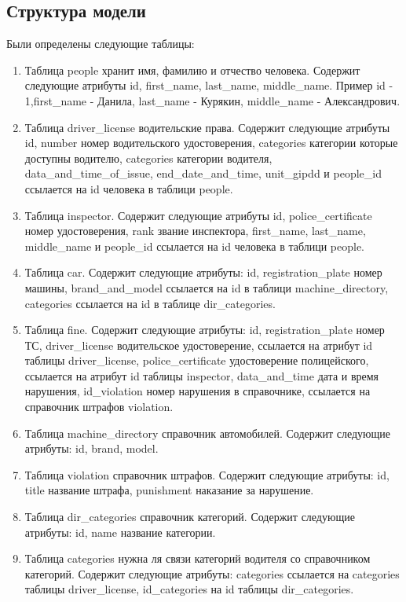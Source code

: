 \subsection{Структура модели}

Были определены следующие таблицы:
\begin{enumerate}

\item Таблица people хранит имя, фамилию и отчество человека. Содержит следующие атрибуты id, first_name, last_name, middle_name. Пример id - 1,first_name - Данила, last_name - Курякин, middle_name - Александрович. 

\item Таблица driver_license водительские права. Содержит следующие атрибуты id, number номер водительского удостоверения, categories категории которые доступны водителю, categories категории водителя, data_and_time_of_issue, end_date_and_time, unit_gipdd и people_id ссылается на id человека в таблици people. 

\item Таблица inspector. Содержит следующие атрибуты id, police_certificate номер удостоверения, rank звание инспектора, first_name, last_name, middle_name и people_id ссылается на id человека в таблици people.

\item Таблица car. Содержит следующие атрибуты: id, registration_plate номер машины, brand_and_model ссылается на id в таблици machine_directory, categories ссылается на id в таблице dir_categories.

\item Таблица fine. Содержит следующие атрибуты: id, registration_plate номер ТС, driver_license водительское удостоверение, ссылается на атрибут id таблицы driver_license, police_certificate удостоверение полицейского, ссылается на атрибут id таблицы inspector, data_and_time дата и время нарушения, id_violation номер нарушения в справочнике, ссылается на справочник штрафов violation.

\item Таблица machine_directory справочник автомобилей. Содержит следующие атрибуты: id, brand, model.

\item Таблица violation справочник штрафов. Содержит следующие атрибуты: id, title название штрафа, punishment наказание за нарушение.

\item Таблица dir_categories справочник категорий. Содержит следующие атрибуты: id, name название категории.

\item Таблица categories нужна ля связи категорий водителя со справочником категорий. Содержит следующие атрибуты: categories ссылается на categories таблицы driver_license, id_categories на id таблицы dir_categories.


\end{enumerate}


